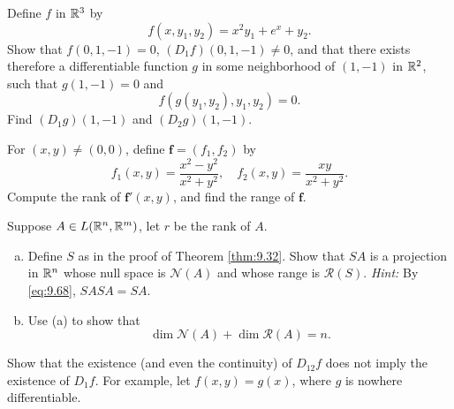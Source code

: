 \begin{myexercise}
    \label{ex:9.23}
    Define $f$ in ${\protect\mathbb R}^3$ by
    \begin{equation*}
        f(x,y_1,y_2) = x^2 y_1 + e^x + y_2 .
    \end{equation*}
    Show that $f(0, 1, -1) = 0$, $(D_1 f) (0, 1, -1) \neq 0$, 
    and that there exists therefore a differentiable function $g$ in some neighborhood of $(1, -1)$ in ${\protect\mathbb R}^2$, 
    such that $g(1, -1) = 0$ and
    \begin{equation*}
        f(g(y_1, y_2), y_1, y_2) = 0.
    \end{equation*}
    Find $(D_1 g)(1, -1)$ and $(D_2 g)(1, -1)$.
\end{myexercise}


\begin{myexercise}
    \label{ex:9.24}
    For $(x, y) \neq (0, 0)$, define $\mathbf{f} = (f_1,f_2)$ by
    \begin{equation*}
        f_1(x,y) = \frac{x^2-y^2}{x^2+y^2}, 
        \quad 
        f_2(x,y) = \frac{xy}{x^2+y^2}.
    \end{equation*}
    Compute the rank of $\mathbf{f}'(x, y)$, and find the range of $\mathbf{f}$.
\end{myexercise}


\begin{myexercise}
    \label{ex:9.25}
    Suppose $A \in L({\protect\mathbb R}^n, {\protect\mathbb R}^m)$, let $r$ be the rank of $A$.
    \begin{enumerate}[(a)]
        \item Define $S$ as in the proof of Theorem \ref{thm:9.32}. Show that $SA$ is a projection in ${\protect\mathbb R}^n$ whose null space is $\mathscr{N}(A)$ and whose range is $\mathscr{R}(S)$. \emph{Hint:} By \eqref{eq:9.68}, $SASA = SA$.
        \item Use (a) to show that 
        \begin{equation*}
            \dim \mathscr{N}(A) + \dim \mathscr{R}(A) = n.
        \end{equation*}
    \end{enumerate}
\end{myexercise}


\begin{myexercise}
    \label{ex:9.26}
    Show that the existence (and even the continuity) of $D_{12}f$ does not imply the existence of $D_1 f$. 
    For example, let $f(x, y) = g(x)$, where $g$ is nowhere differentiable.
\end{myexercise}



